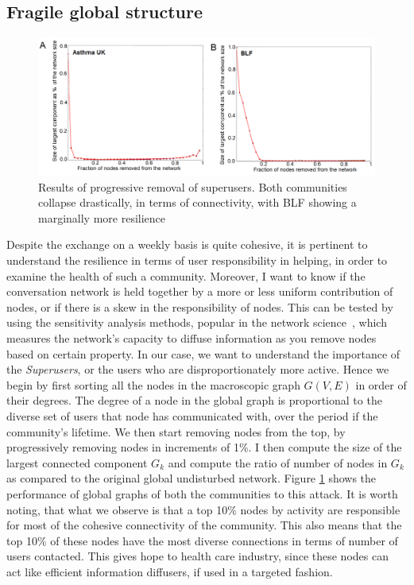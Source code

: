 \subsection{Fragile global structure}
\label{sec:fragility}
\begin{figure}[!ht]
    \includegraphics[width=\textwidth]{jmirSensitivity.png}
    \caption{Results of progressive removal of superusers. Both communities collapse drastically, in terms of connectivity, with BLF showing a marginally more resilience }
    \label{fig:sense_asthma}
\end{figure}
Despite the exchange on a weekly basis is quite cohesive, it is pertinent to understand the resilience in terms of user responsibility in helping, in order to examine the health of such a community. Moreover, I want to know if the conversation network is held together by a more or less uniform contribution of nodes, or if there is a skew in the responsibility of nodes. 
This can be tested by using the sensitivity analysis methods, popular in the network science~\cite{braunstein2016network,albert2000error}, which measures the network's capacity to diffuse information as you remove nodes based on certain property. In our case, we want to understand the importance of the \textsl{Superusers}, or the users who are disproportionately more active. Hence we begin by first sorting all the nodes in the macroscopic graph $G(V,E)$ in order of their degrees. The degree of a node in the global graph is proportional to the diverse set of users that node has communicated with, over the period if the community's lifetime. We then start removing nodes from the top, by progressively removing nodes in increments of 1\%. I then compute the size of the largest connected component $G_k$ and compute the ratio of number of nodes in $G_k$ as compared to the original global undisturbed network.  Figure \ref{fig:sense_asthma} shows the performance of global graphs of both the communities to this attack. It is worth noting, that what we observe is that a top 10\% nodes by activity are responsible for most of the cohesive connectivity of the community. This also means that the top 10\% of these nodes have the most diverse connections in terms of number of users contacted. This gives hope to health care industry, since these nodes can act like efficient information diffusers, if used in a targeted fashion. 

